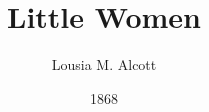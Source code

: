 \usepackage{microtype}
\usepackage{graphicx}
\usepackage{wrapfig}

\title{Little Women}
\author{Lousia M. Alcott}
\date{1868}

\setulmarginsandblock{1in}{0.75in}{*}
\setlrmarginsandblock{0.75in}{0.5in}{*}
\checkandfixthelayout{}

\pagestyle{headings}

\OnehalfSpacing{}

%
%
